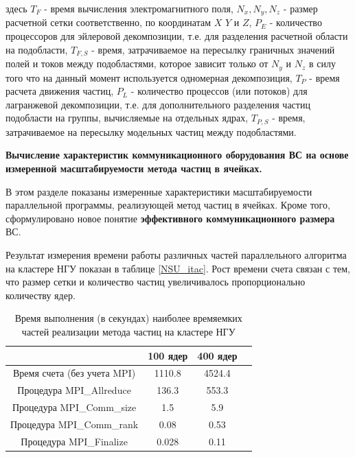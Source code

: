 здесь $T_{F}$ - время вычисления электромагнитного поля, $N_x, N_y, N_z$ - размер расчетной сетки соответственно, по координатам $X$ $Y$ и $Z$, $P_E$ - количество процессоров для эйлеровой декомпозиции, т.е. для разделения расчетной области на подобласти, $T_{F,S}$ - время, затрачиваемое на пересылку граничных значений полей и токов между подобластями, которое зависит только от $N_y$ и $N_z$ в силу того что на данный момент используется одномерная декомпозиция,  $T_P$ - время расчета движения частиц, $P_L$ - количество процессов (или потоков) для лагранжевой декомпозиции, т.е. для дополнительного разделения частиц подобласти на группы, вычисляемые на отдельных ядрах, $T_{P,S}$ - время, затрачиваемое на пересылку модельных частиц между подобластями.


\textbf{Вычисление характеристик коммуникационного оборудования ВС на основе измеренной масштабируемости метода частиц в ячейках.}

В этом разделе показаны измеренные характеристики масштабируемости параллельной программы, реализующей метод частиц в ячейках. Кроме того, сформулировано новое понятие \textbf{эффективного коммуникационного размера} ВС.

Результат измерения времени работы различных частей параллельного алгоритма на кластере НГУ показан в таблице \ref{NSU_itac}. Рост времени счета связан с тем, что размер сетки и количество частиц увеличивалось пропорционально количеству ядер.

\begin{table}[ht]
	\begin{center}
		\caption{Время выполнения (в секундах) наиболее времяемких частей реализации метода частиц на кластере НГУ}
		\begin{tabular}{|c|c|c|c|}
			\hline
			&  100 ядер    & 400 ядер \\ \hline
			Время счета (без учета MPI)   &  1110.8      & 4524.4   \\ \hline
			Процедура MPI\_Allreduce      &  136.3       & 553.3    \\ \hline
			Процедура MPI\_Comm\_size &  1.5         &  5.9    \\ \hline
			Процедура MPI\_Comm\_rank &  0.08        &  0.53            \\
			Процедура MPI\_Finalize   &  0.028        &  0.11  \\ \hline
			
		\end{tabular}
		\label{PerfGPU}
	\end{center}
\end{table}




